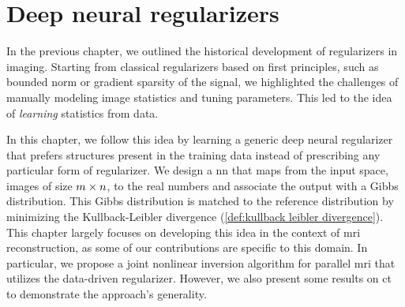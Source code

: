 \chapter{Deep neural regularizers}%
\label{chap:deep neural regularizers}%
\graphicspath{{chapters/deep-neural-regularizers/figures}}%
In the previous chapter, we outlined the historical development of regularizers in imaging.
Starting from classical regularizers based on first principles, such as bounded norm or gradient sparsity of the signal, we highlighted the challenges of manually modeling image statistics and tuning parameters.
This led to the idea of \emph{learning} statistics from data.

In this chapter, we follow this idea by learning a generic deep neural regularizer that prefers structures present in the training data instead of prescribing any particular form of regularizer.
We design a \gls{nn} that maps from the input space, images of size \( m \times n \), to the real numbers and associate the output with a Gibbs distribution.
This Gibbs distribution is matched to the reference distribution by minimizing the Kullback-Leibler divergence (\cref{def:kullback leibler divergence}).
This chapter largely focuses on developing this idea in the context of \gls{mri} reconstruction, as some of our contributions are specific to this domain.
In particular, we propose a joint nonlinear inversion algorithm for parallel \gls{mri} that utilizes the data-driven regularizer.
However, we also present some results on \gls{ct} to demonstrate the approach's generality.


